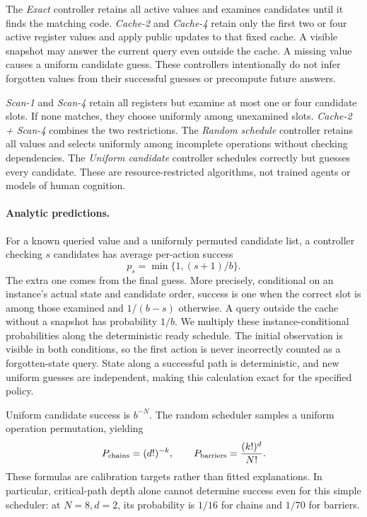 \documentclass[sigconf,nonacm]{acmart}
\begin{document}
The \emph{Exact} controller retains all active values and examines candidates
until it finds the matching code. \emph{Cache-2} and \emph{Cache-4} retain only
the first two or four active register values and apply public updates to
that fixed cache. A visible snapshot may answer the current query even
outside the cache. A missing value causes a uniform candidate guess.
These controllers intentionally do not infer forgotten values from their
successful guesses or precompute future answers.

\emph{Scan-1} and \emph{Scan-4} retain all registers but examine at most one
or four candidate slots. If none matches, they choose uniformly among
unexamined slots. \emph{Cache-2 + Scan-4} combines the two restrictions.
The \emph{Random schedule} controller retains all values and selects uniformly
among incomplete operations without checking dependencies. The
\emph{Uniform candidate} controller schedules correctly but guesses every
candidate. These are resource-restricted algorithms, not trained agents
or models of human cognition.

\paragraph{Analytic predictions.}
For a known queried value and a uniformly permuted candidate list, a
controller checking $s$ candidates has average per-action success
\[
 p_s=\min\{1,(s+1)/b\}.
\]
The extra one comes from the final guess. More precisely, conditional on
an instance's actual state and candidate order, success is one when the
correct slot is among those examined and $1/(b-s)$ otherwise. A query
outside the cache without a snapshot has probability $1/b$. We multiply
these instance-conditional probabilities along the deterministic ready
schedule. The initial observation is visible in both conditions, so the
first action is never incorrectly counted as a forgotten-state query.
State along a successful path is deterministic, and new uniform guesses
are independent, making this calculation exact for the specified policy.

Uniform candidate success is $b^{-N}$. The random scheduler samples a
uniform operation permutation, yielding
\[
 P_{\rm chains}=(d!)^{-k},\qquad
 P_{\rm barriers}=\frac{(k!)^d}{N!}.
\]
These formulas are calibration targets rather than fitted explanations.
In particular, critical-path depth alone cannot determine success even for
this simple scheduler: at $N=8,d=2$, its probability is $1/16$ for chains
and $1/70$ for barriers.
\end{document}
